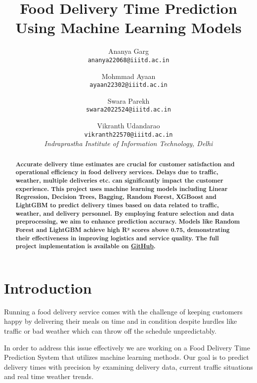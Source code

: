 \documentclass[10pt,twocolumn,letterpaper]{article}
\begin{document}
\title{Food Delivery Time Prediction \\ Using Machine Learning Models}

\author{
    Ananya Garg \\ 
    \small \texttt{ananya22068@iiitd.ac.in} 
    \and 
    Mohmmad Ayaan \\ 
    \small \texttt{ayaan22302@iiitd.ac.in} 
    \and 
    Swara Parekh \\ 
    \small \texttt{swara2022524@iiitd.ac.in} 
    \and 
    Vikranth Udandarao \\ 
    \small \texttt{vikranth22570@iiitd.ac.in} 
    \\[1.5em]
    \textit{Indraprastha Institute of Information Technology, Delhi}
}

\maketitle

\begin{abstract}
    \textbf{Accurate delivery time estimates are crucial for customer satisfaction and operational efficiency in food delivery services. Delays due to traffic, weather, multiple deliveries etc. can significantly impact the customer experience. This project uses machine learning models including Linear Regression, Decision Trees, Bagging, Random Forest, XGBoost and LightGBM to predict delivery times based on data related to traffic, weather, and delivery personnel. By employing feature selection and data preprocessing, we aim to enhance prediction accuracy. Models like Random Forest and LightGBM achieve high R² scores above 0.75, demonstrating their effectiveness in improving logistics and service quality. The full project implementation is available on \href{https://github.com/Vikranth3140/Food-Delivery-Time-Prediction}{GitHub}.}
\end{abstract}

\section{Introduction}
Running a food delivery service comes with the challenge of keeping customers happy by delivering their meals on time and in condition despite hurdles like traffic or bad weather which can throw off the schedule unpredictably.

In order to address this issue effectively we are working on a Food Delivery Time Prediction System that utilizes machine learning methods. Our goal is to predict delivery times with precision by examining delivery data, current traffic situations and real time weather trends.
\end{document}
